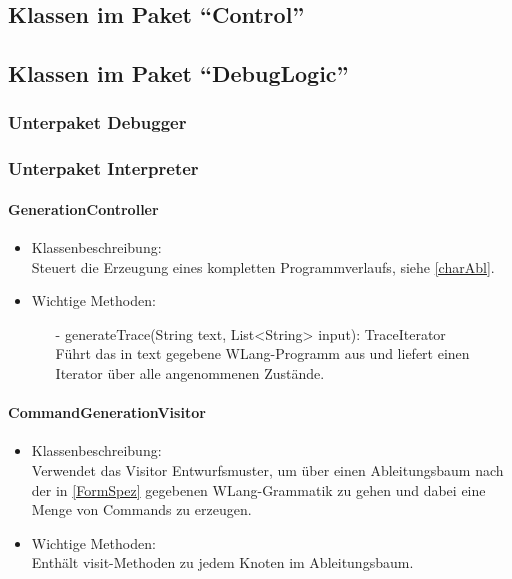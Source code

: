\documentclass[parskip=full]{scrartcl}
\begin{document}
\subsection{Klassen im Paket \enquote{Control}}




\subsection{Klassen im Paket \enquote{DebugLogic}}
\subsubsection{Unterpaket Debugger}
\subsubsection{Unterpaket Interpreter}
\paragraph{GenerationController}
\begin{itemize}
\item Klassenbeschreibung: \\
Steuert die Erzeugung eines kompletten Programmverlaufs, siehe \ref{charAbl}.
\item Wichtige Methoden:\\
\begin{itemize}
\item[-] generateTrace(String text, List<String> input): TraceIterator\\
Führt das in text gegebene WLang-Programm aus und liefert einen Iterator über alle angenommenen Zustände.
\end{itemize}
\end{itemize}

\paragraph{CommandGenerationVisitor}
\begin{itemize}
\item Klassenbeschreibung: \\
Verwendet das Visitor Entwurfsmuster, um über einen Ableitungsbaum nach der in \ref{FormSpez} gegebenen WLang-Grammatik zu gehen und dabei eine Menge von Commands zu erzeugen.
\item Wichtige Methoden:\\
Enthält visit-Methoden zu jedem Knoten im Ableitungsbaum.
\end{itemize}
\end{document}
